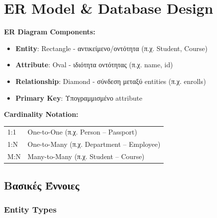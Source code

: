 
\chapter{ER Model \& Database Design}

\begin{formulabox}
\textbf{ER Diagram Components:}
\begin{itemize}
    \item \textbf{Entity}: Rectangle - αντικείμενο/οντότητα (π.χ. Student, Course)
    \item \textbf{Attribute}: Oval - ιδιότητα οντότητας (π.χ. name, id)
    \item \textbf{Relationship}: Diamond - σύνδεση μεταξύ entities (π.χ. enrolls)
    \item \textbf{Primary Key}: Υπογραμμισμένο attribute
\end{itemize}

\textbf{Cardinality Notation:}
\begin{center}
\begin{tabular}{ll}
1:1 & One-to-One (π.χ. Person -- Passport) \\
1:N & One-to-Many (π.χ. Department -- Employee) \\
M:N & Many-to-Many (π.χ. Student -- Course) \\
\end{tabular}
\end{center}
\end{formulabox}

\section{Βασικές Έννοιες}

\subsection{Entity Types}

